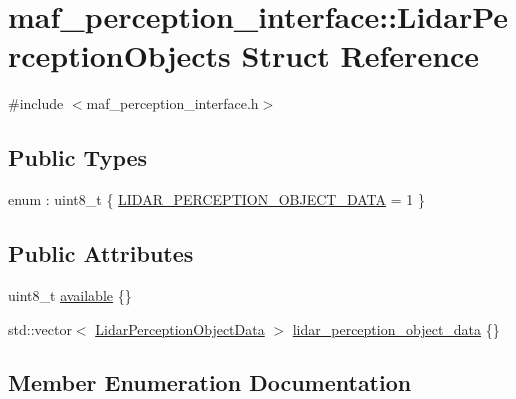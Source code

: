\hypertarget{structmaf__perception__interface_1_1LidarPerceptionObjects}{}\section{maf\+\_\+perception\+\_\+interface\+:\+:Lidar\+Perception\+Objects Struct Reference}
\label{structmaf__perception__interface_1_1LidarPerceptionObjects}


{\ttfamily \#include $<$maf\+\_\+perception\+\_\+interface.\+h$>$}

\subsection*{Public Types}
\begin{DoxyCompactItemize}
\item 
enum \+: uint8\+\_\+t \{ \hyperlink{structmaf__perception__interface_1_1LidarPerceptionObjects_ac6bd9558d9b00b02eb37fb3500c7dabba494f2e74bd04bce873a0739ec523e587}{L\+I\+D\+A\+R\+\_\+\+P\+E\+R\+C\+E\+P\+T\+I\+O\+N\+\_\+\+O\+B\+J\+E\+C\+T\+\_\+\+D\+A\+TA} = 1
 \}
\end{DoxyCompactItemize}
\subsection*{Public Attributes}
\begin{DoxyCompactItemize}
\item 
uint8\+\_\+t \hyperlink{structmaf__perception__interface_1_1LidarPerceptionObjects_a53edc6d1adba90e5d945ac4434ee3bac}{available} \{\}
\item 
std\+::vector$<$ \hyperlink{structmaf__perception__interface_1_1LidarPerceptionObjectData}{Lidar\+Perception\+Object\+Data} $>$ \hyperlink{structmaf__perception__interface_1_1LidarPerceptionObjects_aed684e6b8c9eca6434a9caf04b4a7106}{lidar\+\_\+perception\+\_\+object\+\_\+data} \{\}
\end{DoxyCompactItemize}


\subsection{Member Enumeration Documentation}
\mbox{\label{structmaf__perception__interface_1_1LidarPerceptionObjects_ac6bd9558d9b00b02eb37fb3500c7dabb}} 
